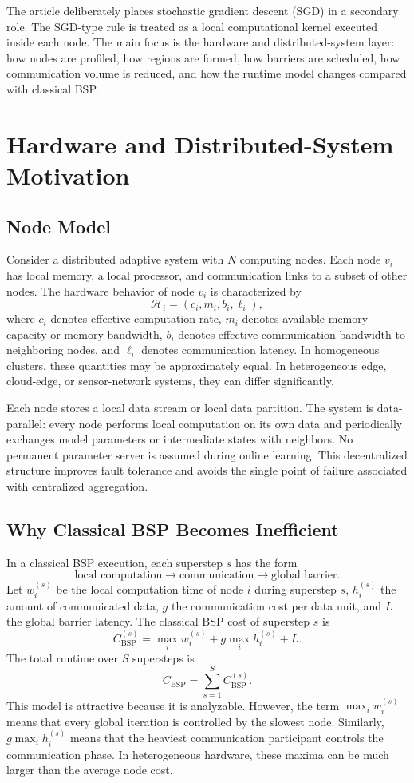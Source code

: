 ﻿\documentclass[10pt,journal]{IEEEtran}
\begin{document}
	The article deliberately places stochastic gradient descent (SGD) in a secondary role. The SGD-type rule is treated as a local computational kernel executed inside each node. The main focus is the hardware and distributed-system layer: how nodes are profiled, how regions are formed, how barriers are scheduled, how communication volume is reduced, and how the runtime model changes compared with classical BSP.
	
	\section{Hardware and Distributed-System Motivation}
	
	\subsection{Node Model}
	
	Consider a distributed adaptive system with $N$ computing nodes. Each node $v_i$ has local memory, a local processor, and communication links to a subset of other nodes. The hardware behavior of node $v_i$ is characterized by
	\[
	\mathcal{H}_i = (c_i, m_i, b_i, \ell_i),
	\]
	where $c_i$ denotes effective computation rate, $m_i$ denotes available memory capacity or memory bandwidth, $b_i$ denotes effective communication bandwidth to neighboring nodes, and $\ell_i$ denotes communication latency. In homogeneous clusters, these quantities may be approximately equal. In heterogeneous edge, cloud-edge, or sensor-network systems, they can differ significantly.
	
	Each node stores a local data stream or local data partition. The system is data-parallel: every node performs local computation on its own data and periodically exchanges model parameters or intermediate states with neighbors. No permanent parameter server is assumed during online learning. This decentralized structure improves fault tolerance and avoids the single point of failure associated with centralized aggregation.
	
	\subsection{Why Classical BSP Becomes Inefficient}
	
	In a classical BSP execution, each superstep $s$ has the form
	\[
	\text{local computation} \rightarrow \text{communication} \rightarrow \text{global barrier}.
	\]
	Let $w_i^{(s)}$ be the local computation time of node $i$ during superstep $s$, $h_i^{(s)}$ the amount of communicated data, $g$ the communication cost per data unit, and $L$ the global barrier latency. The classical BSP cost of superstep $s$ is
	\[
	C_{\mathrm{BSP}}^{(s)}
	=
	\max_i w_i^{(s)}
	+
	g\max_i h_i^{(s)}
	+
	L.
	\]
	The total runtime over $S$ supersteps is
	\[
	C_{\mathrm{BSP}}
	=
	\sum_{s=1}^{S} C_{\mathrm{BSP}}^{(s)}.
	\]
	This model is attractive because it is analyzable. However, the term $\max_i w_i^{(s)}$ means that every global iteration is controlled by the slowest node. Similarly, $g\max_i h_i^{(s)}$ means that the heaviest communication participant controls the communication phase. In heterogeneous hardware, these maxima can be much larger than the average node cost.
	
\end{document}
